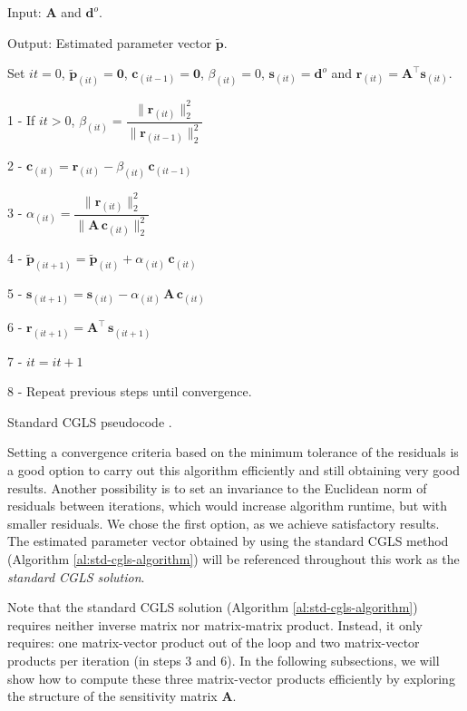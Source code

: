 \begin{algorithm}[H]
	Input: $\mathbf{A}$ and $\mathbf{d}^{o}$.
	
	Output: Estimated parameter vector $\tilde{\mathbf{p}}$.
	
	Set $it = 0$, $\tilde{\mathbf{p}}_{(it)} = \mathbf{0}$, $\mathbf{c}_{(it-1)} = \mathbf{0}$, $\beta_{(it)} = 0$, $\mathbf{s}_{(it)} = \mathbf{d}^{o}$ and $\mathbf{r}_{(it)} = \mathbf{A}^{\top} \mathbf{s}_{(it)}$.
	
	1 - If $it > 0$, $\beta_{(it)} = \dfrac{\| \mathbf{r}_{(it)} \|_{2}^{2}}{\| \mathbf{r}_{(it - 1)} \|_{2}^{2}}$
	
	2 - $\mathbf{c}_{(it)} = \mathbf{r}_{(it)} - \beta_{(it)} \, \mathbf{c}_{(it - 1)}$
	
	3 - $\alpha_{(it)} = \dfrac{{\| \mathbf{r}_{(it)}\|_{2}^{2}}}{\| \mathbf{A} \, \mathbf{c}_{(it)} \|_{2}^{2}}$
	
	4 - $\tilde{\mathbf{p}}_{(it + 1)} = \tilde{\mathbf{p}}_{(it)} + \alpha_{(it)} \, \mathbf{c}_{(it)}$
	
	5 - $\mathbf{s}_{(it + 1)} = \mathbf{s}_{(it)} - \alpha_{(it)} \, \mathbf{A} \, \mathbf{c}_{(it)}$
	
	6 - $\mathbf{r}_{(it + 1)} = \mathbf{A}^{\top} \, \mathbf{s}_{(it + 1)}$
	
	7 - $it = it + 1$
	
	8 - Repeat previous steps until convergence.
	
	\caption{Standard CGLS pseudocode \citep[][ p. 166]{aster2019parameter}.}
\label{al:std-cgls-algorithm}
\end{algorithm}

Setting a convergence criteria based on the minimum tolerance of the residuals is a good 
option to carry out this algorithm efficiently and still obtaining very good results. 
Another possibility is to set an invariance to the Euclidean norm of residuals between 
iterations, which would increase algorithm runtime, but with smaller residuals. 
We chose the first option, as we achieve satisfactory results. 
The estimated parameter vector obtained by using the standard CGLS method 
(Algorithm \ref{al:std-cgls-algorithm}) will be referenced throughout this work as 
the \textit{standard CGLS solution}.

Note that the standard CGLS solution (Algorithm \ref{al:std-cgls-algorithm}) requires 
neither inverse matrix nor matrix-matrix product. Instead, it only requires: one matrix-vector 
product out of the loop and two matrix-vector products per iteration (in steps 3 and 6). 
In the following subsections, we will show how to compute these three matrix-vector products 
efficiently by exploring the structure of the sensitivity matrix $\mathbf{A}$.

